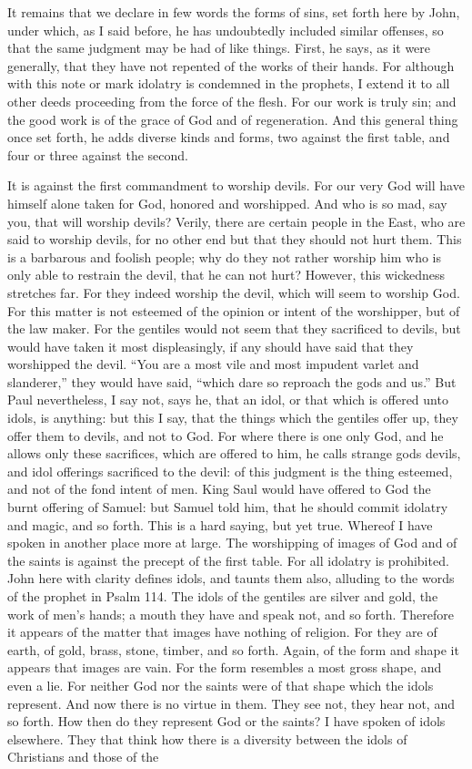 It remains that we declare in few words the forms of sins, set forth here by John, under which, as I said before, he has undoubtedly included similar offenses, so that the same judgment may be had of like things. First, he says, as it were generally, that they have not repented of the works of their hands. For although with this note or mark idolatry is condemned in the prophets, I extend it to all other deeds proceeding from the force of the flesh. For our work is truly sin; and the good work is of the grace of God and of regeneration. And this general thing once set forth, he adds diverse kinds and forms, two against the first table, and four or three against the second.

It is against the first commandment to worship devils. For our very God will have himself alone taken for God, honored and worshipped. And who is so mad, say you, that will worship devils? Verily, there are certain people in the East, who are said to worship devils, for no other end but that they should not hurt them. This is a barbarous and foolish people; why do they not rather worship him who is only able to restrain the devil, that he can not hurt? However, this wickedness stretches far. For they indeed worship the devil, which will seem to worship God. For this matter is not esteemed of the opinion or intent of the worshipper, but of the law maker. For the gentiles would not seem that they sacrificed to devils, but would have taken it most displeasingly, if any should have said that they worshipped the devil. “You are a most vile and most impudent varlet and slanderer,” they would have said, “which dare so reproach the gods and us.” But Paul nevertheless, I say not, says he, that an idol, or that which is offered unto idols, is anything: but this I say, that the things which the gentiles offer up, they offer them to devils, and not to God. For where there is one only God, and he allows only these sacrifices, which are offered to him, he calls strange gods devils, and idol offerings sacrificed to the devil: of this judgment is the thing esteemed, and not of the fond intent of men. King Saul would have offered to God the burnt offering of Samuel: but Samuel told him, that he should commit idolatry and magic, and so forth. This is a hard saying, but yet true. Whereof I have spoken in another place more at large. The worshipping of images of God and of the saints is against the precept of the first table. For all idolatry is prohibited. John here with clarity defines idols, and taunts them also, alluding to the words of the prophet in Psalm 114. The idols of the gentiles are silver and gold, the work of men's hands; a mouth they have and speak not, and so forth. Therefore it appears of the matter that images have nothing of religion. For they are of earth, of gold, brass, stone, timber, and so forth. Again, of the form and shape it appears that images are vain. For the form resembles a most gross shape, and even a lie. For neither God nor the saints were of that shape which the idols represent. And now there is no virtue in them. They see not, they hear not, and so forth. How then do they represent God or the saints? I have spoken of idols elsewhere. They that think how there is a diversity between the idols of Christians and those of the 